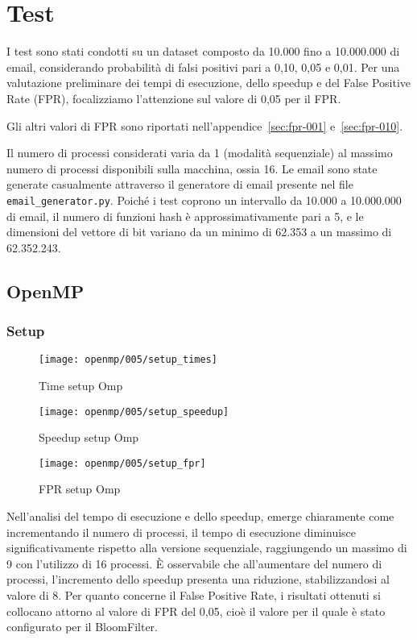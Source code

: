 \section{Test}\label{sec:test}
I test sono stati condotti su un dataset composto da 10.000 fino a 10.000.000 di email, considerando probabilità di
falsi positivi pari a 0,10, 0,05 e 0,01.
Per una valutazione preliminare dei tempi di esecuzione, dello speedup e del False Positive Rate (FPR),
focalizziamo l'attenzione sul valore di 0,05 per il FPR\@.

Gli altri valori di FPR sono riportati nell'appendice~\ref{sec:fpr-001} e~\ref{sec:fpr-010}.

Il numero di processi considerati varia da 1 (modalità sequenziale) al massimo numero di processi disponibili sulla
macchina, ossia 16.
Le email sono state generate casualmente attraverso il generatore di email presente nel file \texttt{email\_generator.py}.
Poiché i test coprono un intervallo da 10.000 a 10.000.000 di email, il numero di funzioni hash è approssimativamente
pari a 5, e le dimensioni del vettore di bit variano da un minimo di 62.353 a un massimo di 62.352.243.

\subsection{OpenMP}\label{subsec:openmp-test}
\subsubsection{Setup}\label{subsubsec:openmp-setup}
\begin{figure}[H]
    \centering
    \texttt{[image: openmp/005/setup\_times]}
        \caption{Time setup Omp}\label{fig:005-setup_time_omp}
    \endminipage\hfill
    \texttt{[image: openmp/005/setup\_speedup]}
        \caption{Speedup setup Omp}\label{fig:005-setup_speedup_omp}
    \endminipage\hfill
\end{figure}
\begin{figure}[H]
    \centering
    \texttt{[image: openmp/005/setup\_fpr]}
        \caption{FPR setup Omp}\label{fig:005-setup_fpr_omp}
    \endminipage\hfill
\end{figure}

Nell'analisi del tempo di esecuzione e dello speedup, emerge chiaramente come incrementando il numero di processi,
il tempo di esecuzione diminuisce significativamente rispetto alla versione sequenziale, raggiungendo un massimo di 9
con l'utilizzo di 16 processi.
È osservabile che all'aumentare del numero di processi, l'incremento dello speedup presenta una riduzione,
stabilizzandosi al valore di 8.
Per quanto concerne il False Positive Rate, i risultati ottenuti si collocano attorno al valore di FPR del 0,05, cioè
il valore per il quale è stato configurato per il BloomFilter.

